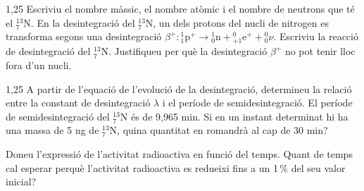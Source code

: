 \begin{apartat}{1,25}
Escriviu el nombre màssic, el nombre atòmic i el nombre de neutrons que té el
$^{13}_{7}\mathrm{N}$. En la desintegració del $^{13}_{7}\mathrm{N}$, un dels protons del
nucli de nitrogen es transforma segons una desintegració
$\beta^+: {}^{1}_{1}\mathrm{p}^+ \to {}^{1}_{0}\mathrm{n} + {}^{0}_{+1}\mathrm{e}^+ + {}^{0}_{0}\nu$.
Escriviu la reacció de desintegració del $^{13}_{7}\mathrm{N}$. Justifiqueu per què la
desintegració $\beta^+$ no pot tenir lloc fora d'un nucli.
\end{apartat}

\begin{apartat}{1,25}
A partir de l'equació de l'evolució de la desintegració, determineu la relació entre la
constant de desintegració $\lambda$ i el període de semidesintegració. El període de
semidesintegració del $^{13}_{7}\mathrm{N}$ és de 9,965 min. Si en un instant determinat
hi ha una massa de 5 ng de $^{13}_{7}\mathrm{N}$, quina quantitat en romandrà al cap de
30 min?

Doneu l'expressió de l'activitat radioactiva en funció del temps. Quant de temps cal
esperar perquè l'activitat radioactiva es redueixi fins a un 1\,\% del seu valor inicial?
\end{apartat}

